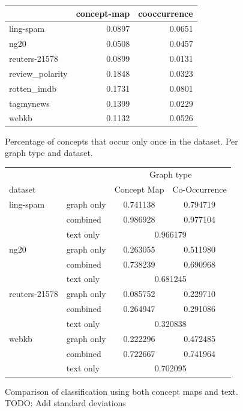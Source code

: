 \begin{figure}[ht]
\centering
\begin{tabular}{lrr}
\toprule
 &  concept-map &  cooccurrence \\
\midrule
ling-spam       &  0.0897 &  0.0651 \\
ng20            &  0.0508 &  0.0457 \\
reuters-21578   &  0.0899 &  0.0131 \\
review\_polarity &  0.1848 &  0.0323 \\
rotten\_imdb     &  0.1731 &  0.0801 \\
tagmynews       &  0.1399 &  0.0229 \\
webkb           &  0.1132 &  0.0526 \\
\bottomrule
\end{tabular}\caption{Percentage of concepts that occur only once in the dataset. Per graph type and dataset.}
\end{figure}

\begin{figure}[ht]
\centering
\begin{tabular}{llcc}
  &  & \multicolumn{2}{c}{Graph type} \\
   dataset   & &  Concept Map &  Co-Occurrence \\
\midrule
ling-spam 
          & graph only &  0.741138 &  0.794719\\
          & combined &  0.986928 &  0.977104\\
          & text only & \multicolumn{2}{c}{ 0.966179 }\\
\midrule
ng20 
          & graph only &  0.263055 &  0.511980\\
          & combined &  0.738239 &  0.690968\\
          & text only & \multicolumn{2}{c}{ 0.681245 }\\
\midrule
reuters-21578 
          & graph only &  0.085752 &  0.229710\\
          & combined &  0.264947 &  0.291086\\
          & text only & \multicolumn{2}{c}{ 0.320838 }\\
\midrule
webkb 
          & graph only &  0.222296 &  0.472485\\
          & combined &  0.722667 &  0.741964\\
          & text only & \multicolumn{2}{c}{ 0.702095 }\\	
\bottomrule
\end{tabular}
\caption{Comparison of classification using both concept maps and text. TODO: Add standard deviations}%
\label{fig:results_comparison_combined}
\end{figure}

